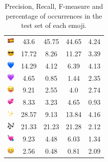 \documentclass{article}
\begin{document}
\begin{table}
\begin{tabular}{|c|ccc|c|}
\includegraphics[height=0.37cm,width=0.37cm]{img/Spain.png} & 43.6 & 45.75 & 44.65 & 4.24\\ 
\includegraphics[height=0.37cm,width=0.37cm]{img/smiling_face_with_sunglasses.png} & 17.72 & 8.26 & 11.27 & 3.39\\ 
\includegraphics[height=0.37cm,width=0.37cm]{img/blue_heart.png} & 14.29 & 4.12 & 6.39 & 4.13\\ 
\includegraphics[height=0.37cm,width=0.37cm]{img/purple_heart.png} & 4.65 & 0.85 & 1.44 & 2.35\\ 
\includegraphics[height=0.37cm,width=0.37cm]{img/winking_face_with_tongue.png} & 9.21 & 2.55 & 4.0 & 2.74\\ 
\includegraphics[height=0.37cm,width=0.37cm]{img/revolving_hearts.png} & 8.33 & 3.23 & 4.65 & 0.93\\ 
\includegraphics[height=0.37cm,width=0.37cm]{img/sparkles.png} & 28.57 & 9.13 & 13.84 & 4.16\\ 
\includegraphics[height=0.37cm,width=0.37cm]{img/musical_notes.png} & 21.33 & 21.23 & 21.28 & 2.12\\ 
\includegraphics[height=0.37cm,width=0.37cm]{img/heart_with_arrow.png} & 9.23 & 4.48 & 6.03 & 1.34\\ 
\includegraphics[height=0.37cm,width=0.37cm]{img/beaming_face_with_smiling_eyes.png} & 2.56 & 0.48 & 0.81 & 2.09\\ 

\hline
\end{tabular}
\caption{\label{table:emoji_detailed} Precision, Recall, F-measure and percentage of occurrences in the test set of each emoji.}
\end{table}
\end{document}
